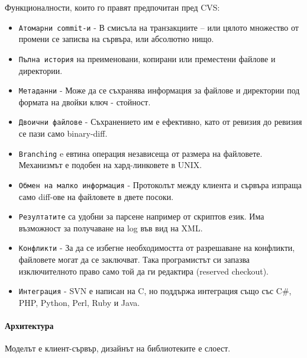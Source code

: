 \documentclass[a4paper]{article}
\begin{document}
    Функционалности, които го правят предпочитан пред CVS:
    \begin{itemize}
      \item \texttt{Атомарни commit-и} - В смисъла на транзакциите -- или цялото множество от промени се записва на сървъра, или абсолютно нищо.
      \item \texttt{Пълна история} на преименовани, копирани или преместени файлове и директории.
      \item \texttt{Метаданни} - Може да се съхранява информация за файлове и директории под формата на двойки ключ - стойност.
      \item \texttt{Двоични файлове} - Съхранението им е ефективно, като от ревизия до ревизия се пази само binary-diff.
      \item \texttt{Branching} e евтина операция независеща от размера на файловете. Механизмът е подобен на хард-линковете в UNIX.
      \item \texttt{Обмен на малко информация} - Протоколът между клиента и сървъра изпраща само diff-ове на файловете в двете посоки.
      \item \texttt{Резултатите} са удобни за парсене например от скриптов език. Има възможност за получаване на log във вид на XML.
      \item \texttt{Конфликти} - За да се избегне необходимостта от разрешаване на конфликти, файловете могат да се заключват. Така програмистът си запазва изключителното право само той да ги редактира (reserved checkout).
      \item \texttt{Интеграция} - SVN е написан на C, но поддържа интеграция също със C\#, PHP, Python, Perl, Ruby и Java.
    \end{itemize}

    \paragraph{Архитектура}
    Моделът е клиент-сървър, дизайнът на библиотеките е слоест.
\end{document}
